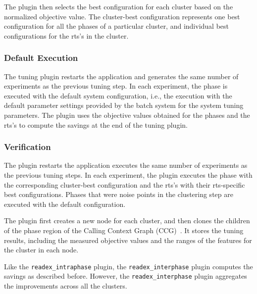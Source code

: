 The plugin then selects the best configuration for each cluster based on the normalized objective value. The cluster-best configuration represents one best configuration for all the phases of a particular cluster, and individual best configurations for the rts's in the cluster.

\subsubsection{Default Execution} \label{default-execution} 
The tuning plugin restarts the application and generates the same number of experiments as the previous tuning step. In each experiment, the phase is executed with the default system configuration, i.e., the execution with the default parameter settings provided by the batch system for the system tuning parameters. The plugin uses the objective values obtained for the phases and the rts’s to compute the savings at the end of the tuning plugin.

\subsubsection{Verification} \label{verification} 
The plugin restarts the application executes the same number of experiments as the previous tuning steps. In each experiment, the plugin executes the phase with the
corresponding cluster-best configuration and the rts's with their rts-specific
best configurations. Phases that were noise points in the clustering step are executed with the default configuration.

The plugin first creates a new node for each cluster, and then clones the children of the phase region of the Calling Context Graph (CCG)~\cite{kumaraswamy2018design}. It stores the tuning results, including the measured objective values and the ranges of the features for the cluster in each node. 

Like the \texttt{readex\_intraphase} plugin, the \texttt{readex\_interphase} plugin computes the savings as described before. However, the \texttt{readex\_interphase} plugin aggregates the improvements across all the clusters.


